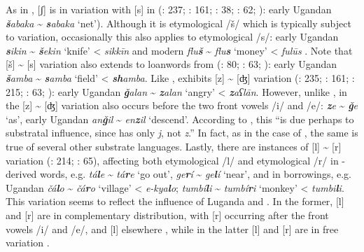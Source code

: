\documentclass[output=paper]{langsci/langscibook}
\begin{document}
  As in  , [ʃ] is in variation with [s] in  (\citealt{Owens1985}: 237; \citealt{Owens1997}: 161; \citealt{Wellens2003}: 38; \citealt{Luffin2005}: 62; \citealt{Avram2017talk}): early Ugandan  \textit{\textbf{š}abaka} {\textasciitilde} \textit{\textbf{s}abaka} ‘net’). Although it is etymological /š/ which is typically subject to variation, occasionally this also applies to etymological /s/: early Ugandan  \textit{\textbf{s}ikin} {\textasciitilde} \textit{\textbf{š}ekin} ‘knife’ <  \textit{sikkīn} \citep{Avram2017talk} and modern  \textit{flu\textbf{š}} {\textasciitilde} \textit{flu\textbf{s}} ‘money’ <  \textit{fulūs} \citep[63]{Luffin2005}. Note that [š] {\textasciitilde} [s] variation also extends to {loanwords} from  (\citealt{Wellens2003}: 80; \citealt{Luffin2005}: 63; \citealt{Avram2017talk}): early Ugandan  \textit{\textbf{š}amba} {\textasciitilde} \textit{\textbf{s}amba} ‘field’ <  \textit{\textbf{sh}amba}. Like  ,  exhibits [z] {\textasciitilde} [ʤ] variation (\citealt{Owens1985}: 235; \citealt{Owens1997}: 161; \citealt{Wellens2003}: 215; \citealt{Luffin2005}: 63; \citealt{Avram2017talk}): early Ugandan  \textit{\textbf{ǧ}alan} {\textasciitilde} \textit{\textbf{z}alan} ‘angry’ <  \textit{\textbf{z}aʕlān}. However, unlike  , in  the [z] {\textasciitilde} [ʤ] variation also occurs before the two front vowels /i/ and /e/: \textit{\textbf{z}e} {\textasciitilde} \textit{\textbf{ǧ}e} ‘as’, early Ugandan  \textit{an\textbf{ǧ}il} {\textasciitilde} \textit{en\textbf{z}il} ‘descend’. According to \citet[161]{Owens1997}, this “is due perhaps to  substratal influence, since  has only \textit{j}, not \textit{z}.” In fact, as in the case of  , the same is true of several other {substrate} languages. Lastly, there are instances of [l] {\textasciitilde} [r] variation (\citealt{Wellens2003}: 214; \citealt{Luffin2005}: 65), affecting both etymological /l/ and etymological /r/ in -derived words, e.g. \textit{tá\textbf{l}e} {\textasciitilde} \textit{tá\textbf{r}e} ‘go out’, \textit{ge\textbf{r}í} {\textasciitilde} \textit{ge\textbf{l}í} ‘near’, and in borrowings, e.g. Ugandan  \textit{čá\textbf{l}o} {\textasciitilde} \textit{čá\textbf{r}o} ‘village’ <  \textit{e-kya\textbf{l}o};  \textit{tumbí\textbf{l}i} {\textasciitilde} \textit{tumbí\textbf{r}i} ‘monkey’ <  \textit{tumbi\textbf{l}i}. This variation seems to reflect the influence of \mbox{Luganda} and . In the former, [l] and [r] are in complementary distribution, with [r] occurring after the front vowels /i/ and /e/, and [l] elsewhere \citep[214]{Wellens2003}, while in the latter [l] and [r] are in free variation \citep[79]{Luffin2014}. 
\end{document}
